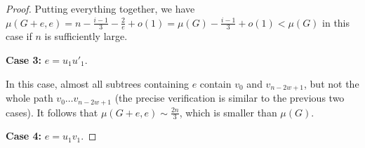 \documentclass[11pt]{article}
\newcommand*{\myproofname}{Proof}
\newenvironment{claimproof}[1][\myproofname]{\begin{proof}[#1]\renewcommand*{\qedsymbol}{\(\diamondsuit\)}}{\end{proof}}
\theoremstyle{definition}
\newcommand*{\abs}[1]{\lvert #1\rvert}
\begin{document}
\begin{proof}

 


Putting everything together, we have $\mu(G+e,e)=n - \frac{i-1}{3} - \frac{2}{e} + o(1) = \mu(G)-\frac{i-1}3+o(1)<\mu(G)$ in this case if $n$ is sufficiently large.
 
 \textbf{Case 3:} $e=u_1 u'_1.$
 
 In this case, almost all subtrees containing $e$ contain $v_0$ and $v_{n-2w+1}$, but not the whole path $v_0 \ldots v_{n-2w+1}$ (the precise verification is similar to the previous two cases). It follows that $\mu(G+e,e) \sim \frac{2n}3$, which is smaller than $\mu(G)$.

 \textbf{Case 4:} $e=u_1 v_1.$


\end{proof}
\end{document}
